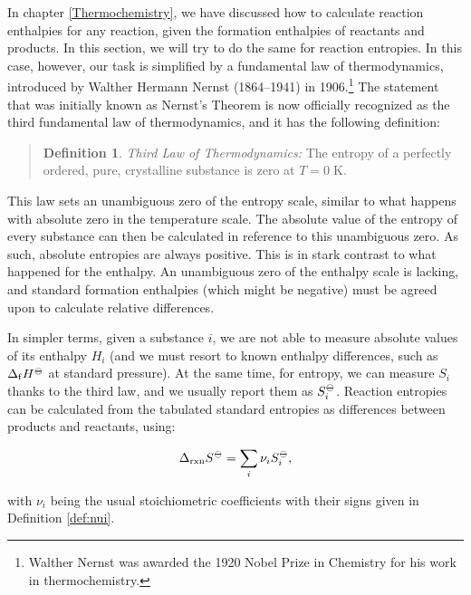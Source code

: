 \documentclass[
]{book}
\theoremstyle{definition}
\newtheorem{definition}{Definition}[chapter]
\theoremstyle{definition}
\theoremstyle{definition}
\theoremstyle{remark}
\begin{document}
In chapter \ref{Thermochemistry}, we have discussed how to calculate reaction enthalpies for any reaction, given the formation enthalpies of reactants and products. In this section, we will try to do the same for reaction entropies. In this case, however, our task is simplified by a fundamental law of thermodynamics, introduced by Walther Hermann Nernst (1864--1941) in 1906.\footnote{Walther Nernst was awarded the 1920 Nobel Prize in Chemistry for his work in thermochemistry.} The statement that was initially known as Nernst's Theorem is now officially recognized as the third fundamental law of thermodynamics, and it has the following definition:

\begin{quote}
\begin{definition}
\protect\hypertarget{def:thirdlawdef}{}{\label{def:thirdlawdef} }\emph{Third Law of Thermodynamics:} The entropy of a perfectly ordered, pure, crystalline substance is zero at \(T=0 \; \text{K}\).
\end{definition}
\end{quote}

This law sets an unambiguous zero of the entropy scale, similar to what happens with absolute zero in the temperature scale. The absolute value of the entropy of every substance can then be calculated in reference to this unambiguous zero. As such, absolute entropies are always positive. This is in stark contrast to what happened for the enthalpy. An unambiguous zero of the enthalpy scale is lacking, and standard formation enthalpies (which might be negative) must be agreed upon to calculate relative differences.

In simpler terms, given a substance \(i\), we are not able to measure absolute values of its enthalpy \(H_i\) (and we must resort to known enthalpy differences, such as \(\Delta_{\mathrm{f}} H^{-\kern-6pt{\ominus}\kern-6pt-}\) at standard pressure). At the same time, for entropy, we can measure \(S_i\) thanks to the third law, and we usually report them as \(S_i^{-\kern-6pt{\ominus}\kern-6pt-}\). Reaction entropies can be calculated from the tabulated standard entropies as differences between products and reactants, using:

\begin{equation}
\Delta_{\text{rxn}} S^{-\kern-6pt{\ominus}\kern-6pt-}= \sum_i \nu_i S_i^{-\kern-6pt{\ominus}\kern-6pt-},
\label{eq:thirdlaweq}
\end{equation}

with \(\nu_i\) being the usual stoichiometric coefficients with their signs given in Definition \ref{def:nui}.
\end{document}

